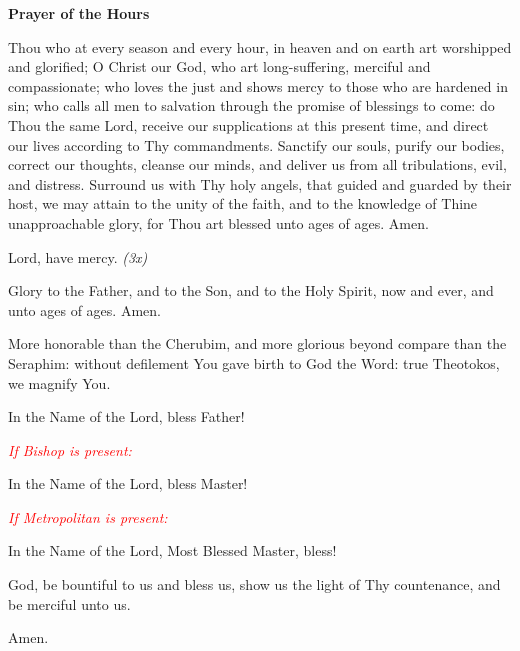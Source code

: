 \begin{center}
\textbf{Prayer of the Hours}
\end{center}

\begin{hang}
\noindent{}Thou who at every season and every hour, in 
heaven and on earth art worshipped and glorified; O Christ our God, who art 
long-suffering, merciful and compassionate; who loves the just and shows mercy 
to those who are hardened in sin; who calls all men to salvation through the 
promise of blessings to come: do Thou the same Lord, receive our supplications 
at this present time, and direct our lives according to Thy commandments. 
Sanctify our souls,  purify our bodies, correct our thoughts, cleanse our 
minds, and deliver us from all tribulations, evil, and distress. Surround us 
with Thy holy angels, that guided and guarded by their host, we may attain to 
the unity of the faith, and to the knowledge of Thine unapproachable glory, for 
Thou art blessed unto ages of ages. Amen.

Lord, have mercy. \textit{(3x)}

Glory to the Father, and to the Son, and to the Holy Spirit, now and ever, and unto ages of ages.  Amen.

More honorable than the Cherubim, and more glorious beyond compare than the Seraphim: without defilement You gave birth to God the Word: true Theotokos, we magnify You.

In the Name of the Lord, bless Father!

\textcolor{red}{\textit{If Bishop is present:}}

In the Name of the Lord, bless Master!

\textcolor{red}{\textit{If Metropolitan is present:}}

In the Name of the Lord, Most Blessed Master, bless!

\end{hang}

\begin{hang}
\noindent{}God, be bountiful to us and bless us, show 
us the light of Thy countenance, and be merciful unto us.

\end{hang}

\begin{hang}
\noindent{}Amen.

\end{hang}


